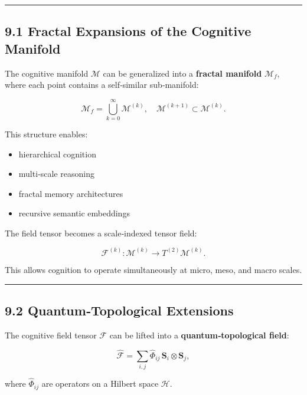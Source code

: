 \begin{center}\rule{0.5\linewidth}{0.5pt}\end{center}

\subsection{9.1 Fractal Expansions of the Cognitive Manifold}\label{fractal-expansions-of-the-cognitive-manifold}

The cognitive manifold \(\mathcal{M}\) can be generalized into a \textbf{fractal manifold} \(\mathcal{M}_f\), where each point contains a self‑similar sub‑manifold:

\[
\mathcal{M}_f = \bigcup_{k=0}^{\infty} \mathcal{M}^{(k)}, \quad \mathcal{M}^{(k+1)} \subset \mathcal{M}^{(k)}.
\]

This structure enables:

\begin{itemize}
\tightlist
\item
  hierarchical cognition\\
\item
  multi‑scale reasoning\\
\item
  fractal memory architectures\\
\item
  recursive semantic embeddings
\end{itemize}

The field tensor becomes a scale‑indexed tensor field:

\[
\mathcal{F}^{(k)} : \mathcal{M}^{(k)} \rightarrow T^{(2)}\mathcal{M}^{(k)}.
\]

This allows cognition to operate simultaneously at micro, meso, and macro scales.

\begin{center}\rule{0.5\linewidth}{0.5pt}\end{center}

\subsection{9.2 Quantum‑Topological Extensions}\label{quantumtopological-extensions}

The cognitive field tensor \(\mathcal{F}\) can be lifted into a \textbf{quantum‑topological field}:

\[
\widehat{\mathcal{F}} = \sum_{i,j} \widehat{\Phi}_{ij} \, \mathbf{S}_i \otimes \mathbf{S}_j,
\]

where \(\widehat{\Phi}_{ij}\) are operators on a Hilbert space \(\mathcal{H}\).

